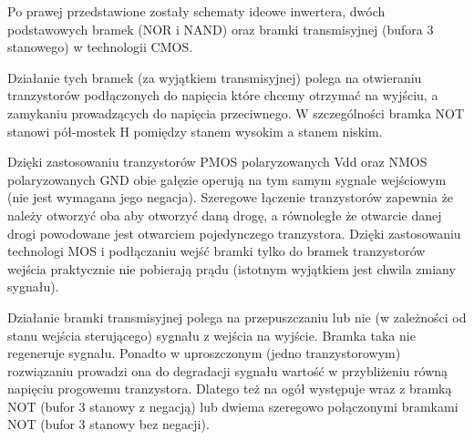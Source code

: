 \documentclass{pdfBooklets}
\begin{document}
Po prawej przedstawione zostały schematy ideowe inwertera, dwóch podstawowych bramek (NOR i NAND) oraz bramki transmisyjnej (bufora 3 stanowego) w technologii CMOS.

Działanie tych bramek (za wyjątkiem transmisyjnej) polega na otwieraniu tranzystorów podłączonych do napięcia które chcemy otrzymać na wyjściu, a zamykaniu prowadzących do napięcia przeciwnego. W szczególności bramka NOT stanowi pół-mostek H pomiędzy stanem wysokim a stanem niskim.

Dzięki zastosowaniu tranzystorów PMOS polaryzowanych Vdd oraz NMOS polaryzowanych GND obie gałęzie operują na tym samym sygnale wejściowym (nie jest wymagana jego negacja). Szeregowe łączenie tranzystorów zapewnia że należy otworzyć oba aby otworzyć daną drogę, a równoległe że otwarcie danej drogi powodowane jest otwarciem pojedynczego tranzystora. Dzięki zastosowaniu technologi MOS i podłączaniu wejść bramki tylko do bramek tranzystorów wejścia praktycznie nie pobierają prądu (istotnym wyjątkiem jest chwila zmiany sygnału).

Działanie bramki transmisyjnej polega na przepuszczaniu lub nie (w zależności od stanu wejścia sterującego) sygnału z wejścia na wyjście. Bramka taka nie regeneruje sygnału. Ponadto w uproszczonym (jedno tranzystorowym) rozwiązaniu prowadzi ona do degradacji sygnału wartość w przybliżeniu równą napięciu progowemu tranzystora. Dlatego też na ogół występuje wraz z bramką NOT (bufor 3 stanowy z negacją) lub dwiema szeregowo połączonymi bramkami NOT (bufor 3 stanowy bez negacji).
\end{document}

